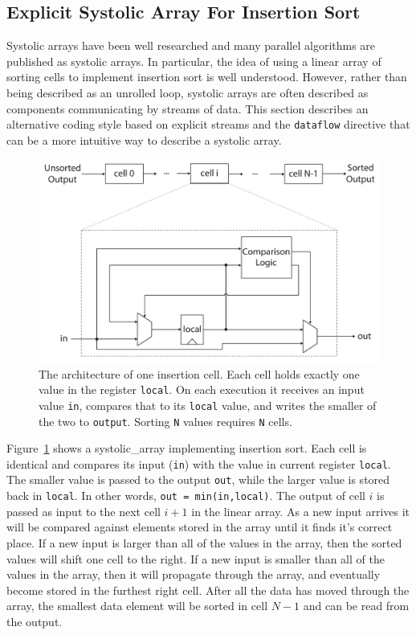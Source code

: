 \subsection{Explicit Systolic Array For Insertion Sort}
\label{sec:insertion_cells}
Systolic arrays have been well researched and many parallel algorithms are published as systolic arrays.  In particular, the idea of using a linear array of sorting cells to implement insertion sort is well understood\cite{ortiz2011streaming, bednara2000tradeoff, marcelino2008sorting, arcas2014empirical}. However, rather than being described as an unrolled loop, systolic arrays are often described as components communicating by streams of data. This section describes an alternative coding style based on explicit streams and the \lstinline{dataflow} directive that can be a more intuitive way to describe a systolic array.
  
\begin{figure}
\centering
\includegraphics[width= \textwidth]{images/insertion_cell}
\caption{ The architecture of one insertion cell. Each cell holds exactly one value in the register \lstinline{local}. On each execution it receives an input value \lstinline{in}, compares that to its \lstinline{local} value, and writes the smaller of the two to \lstinline{output}. Sorting \lstinline{N} values requires \lstinline{N} cells. }
\label{fig:insertion_cell}
\end{figure}

Figure~\ref{fig:insertion_cell} shows a \gls{systolic_array} implementing insertion sort. Each cell is identical and compares its input (\lstinline{in}) with the value in current register \lstinline{local}. The smaller value is passed to the output \lstinline{out}, while the larger value is stored back in \lstinline{local}. In other words, \lstinline{out = min(in,local)}.  The output of cell $i$ is passed as input to the next cell $i+1$ in the linear array. As a new input arrives it will be compared against elements stored in the array until it finds it's correct place.  If a new input is larger than all of the  values in the array, then the sorted values will shift one cell to the right.  If a new input is smaller than all of the values in the array, then it will propagate through the array, and eventually become stored in the furthest right cell. After all the data has moved through the array, the smallest data element will be sorted in cell $N-1$ and can be read from the output. 

